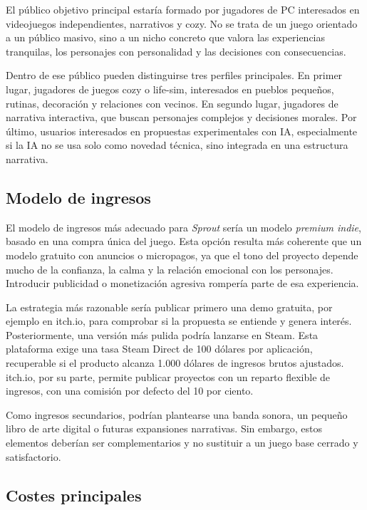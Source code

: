 \documentclass[12pt,twoside,titlepage]{report}
\begin{document}
El público objetivo principal estaría formado por jugadores de PC interesados en videojuegos independientes, narrativos y cozy. No se trata de un juego orientado a un público masivo, sino a un nicho concreto que valora las experiencias tranquilas, los personajes con personalidad y las decisiones con consecuencias.

Dentro de ese público pueden distinguirse tres perfiles principales. En primer lugar, jugadores de juegos cozy o life-sim, interesados en pueblos pequeños, rutinas, decoración y relaciones con vecinos. En segundo lugar, jugadores de narrativa interactiva, que buscan personajes complejos y decisiones morales. Por último, usuarios interesados en propuestas experimentales con IA, especialmente si la IA no se usa solo como novedad técnica, sino integrada en una estructura narrativa.

\subsection{Modelo de ingresos}

El modelo de ingresos más adecuado para \textit{Sprout} sería un modelo \textit{premium indie}, basado en una compra única del juego. Esta opción resulta más coherente que un modelo gratuito con anuncios o micropagos, ya que el tono del proyecto depende mucho de la confianza, la calma y la relación emocional con los personajes. Introducir publicidad o monetización agresiva rompería parte de esa experiencia.

La estrategia más razonable sería publicar primero una demo gratuita, por ejemplo en itch.io, para comprobar si la propuesta se entiende y genera interés. Posteriormente, una versión más pulida podría lanzarse en Steam. Esta plataforma exige una tasa Steam Direct de 100 dólares por aplicación, recuperable si el producto alcanza 1.000 dólares de ingresos brutos ajustados. itch.io, por su parte, permite publicar proyectos con un reparto flexible de ingresos, con una comisión por defecto del 10 por ciento.

Como ingresos secundarios, podrían plantearse una banda sonora, un pequeño libro de arte digital o futuras expansiones narrativas. Sin embargo, estos elementos deberían ser complementarios y no sustituir a un juego base cerrado y satisfactorio.

\subsection{Costes principales}
\end{document}
